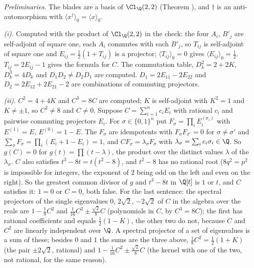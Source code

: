 \emph{Preliminaries.} The blades are a basis of $\Cl_{\Q}(2,2)$ (Theorem ), and $\dagger$ is an anti-automorphism with $\langle x^{\dagger}\rangle_{0} = \langle x\rangle_{0}$.

\emph{(i).} Computed with the product of $\Cl_{\Q}(2,2)$ in the check: the four $A_{i}$, $B'_{j}$ are self-adjoint of square one, each $A_{i}$ commutes with each $B'_{j}$, so $T_{ij}$ is self-adjoint of square one and $E_{ij} = \tfrac12(1 + T_{ij})$ is a projector; $\langle T_{ij}\rangle_{0} = 0$ gives $\langle E_{ij}\rangle_{0} = \tfrac12$. $T_{ij} = 2E_{ij} - 1$ gives the formula for $C$. The commutation table, $D_{k}^{2} = 2 + 2K$, $D_{k}^{3} = 4D_{k}$ and $D_{1}D_{2} \ne D_{2}D_{1}$ are computed. $D_{1} = 2E_{11} - 2E_{22}$ and $D_{2} = 2E_{12} + 2E_{21} - 2$ are combinations of commuting projectors.

\emph{(ii).} $C^{2} = 4 + 4K$ and $C^{3} = 8C$ are computed; $K$ is self-adjoint with $K^{2} = 1$ and $K \ne \pm 1$, so $C^{2} \ne 8$ and $C \ne 0$. Suppose $C = \sum_{i=1}^{n}c_{i}E_{i}$ with rational $c_{i}$ and pairwise commuting projectors $E_{i}$. For $\sigma \in \{0,1\}^{n}$ put $F_{\sigma} = \prod_{i}E_{i}^{(\sigma_{i})}$ with $E^{(1)} = E$, $E^{(0)} = 1 - E$. The $F_{\sigma}$ are idempotents with $F_{\sigma}F_{\sigma'} = 0$ for $\sigma \ne \sigma'$ and $\sum_{\sigma}F_{\sigma} = \prod_{i}(E_{i} + 1 - E_{i}) = 1$, and $CF_{\sigma} = \lambda_{\sigma}F_{\sigma}$ with $\lambda_{\sigma} = \sum_{i}c_{i}\sigma_{i} \in \Q$. So $g(C) = 0$ for $g(t) = \prod(t - \lambda)$, the product over the distinct values $\lambda$ of the $\lambda_{\sigma}$. $C$ also satisfies $t^{3} - 8t = t(t^{2} - 8)$, and $t^{2} - 8$ has no rational root ($8q^{2} = p^{2}$ is impossible for integers, the exponent of $2$ being odd on the left and even on the right). So the greatest common divisor of $g$ and $t^{3} - 8t$ in $\Q[t]$ is $1$ or $t$, and $C$ satisfies it: $1 = 0$ or $C = 0$, both false. For the last sentence: the spectral projectors of the single eigenvalues $0$, $2\sqrt{2}$, $-2\sqrt{2}$ of $C$ in the algebra over the reals are $1 - \tfrac18C^{2}$ and $\tfrac1{16}C^{2} \pm \tfrac{\sqrt{2}}{8}C$ (polynomials in $C$, by $C^{3} = 8C$); the first has rational coefficients and equals $\tfrac12(1 - K)$, the other two do not, because $C$ and $C^{2}$ are linearly independent over $\Q$. A spectral projector of a set of eigenvalues is a sum of these; besides $0$ and $1$ the sums are the three above, $\tfrac18C^{2} = \tfrac12(1 + K)$ (the pair $\pm 2\sqrt{2}$, rational) and $1 - \tfrac1{16}C^{2} \pm \tfrac{\sqrt{2}}{8}C$ (the kernel with one of the two, not rational, for the same reason).

